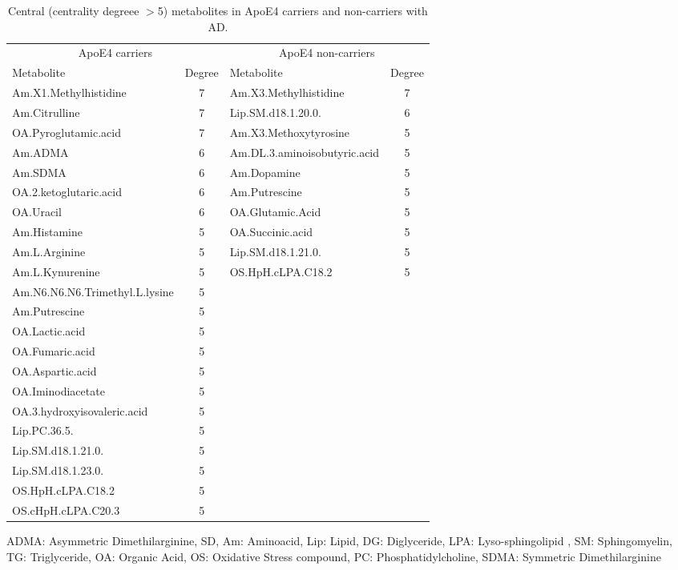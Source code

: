 \documentclass{amsart}
\begin{document}
\begin{table}[H]
  \caption{\label{tab:degrees} Central (centrality degreee $>$5) metabolites in ApoE4 carriers and non-carriers with AD.}
  \begin{threeparttable}
  \begin{tabular}{lclc}\toprule
  \multicolumn{2}{c}{ApoE4 carriers} & \multicolumn{2}{c}{ApoE4 non-carriers} \\
  Metabolite & Degree & Metabolite & Degree \\ \midrule
  Am.X1.Methylhistidine & 7 & Am.X3.Methylhistidine & 7 \\
  Am.Citrulline & 7 & Lip.SM.d18.1.20.0. & 6 \\
  OA.Pyroglutamic.acid & 7 & Am.X3.Methoxytyrosine & 5 \\
  Am.ADMA & 6 & Am.DL.3.aminoisobutyric.acid & 5 \\
  Am.SDMA & 6 & Am.Dopamine & 5 \\
  OA.2.ketoglutaric.acid & 6 & Am.Putrescine & 5 \\
  OA.Uracil & 6 & OA.Glutamic.Acid & 5 \\
  Am.Histamine & 5 & OA.Succinic.acid & 5 \\
  Am.L.Arginine & 5 & Lip.SM.d18.1.21.0. & 5 \\
  Am.L.Kynurenine & 5 & OS.HpH.cLPA.C18.2 & 5 \\
  Am.N6.N6.N6.Trimethyl.L.lysine & 5 &  &  \\
  Am.Putrescine & 5 &  &  \\
  OA.Lactic.acid & 5 &  &  \\
  OA.Fumaric.acid & 5 &  &  \\
  OA.Aspartic.acid & 5 &  &  \\
  OA.Iminodiacetate & 5 &  &  \\
  OA.3.hydroxyisovaleric.acid & 5 &  &  \\
  Lip.PC.36.5. & 5 &  &  \\
  Lip.SM.d18.1.21.0. & 5 &  &  \\
  Lip.SM.d18.1.23.0. & 5 &  &  \\
  OS.HpH.cLPA.C18.2 & 5 &  &  \\
  OS.cHpH.cLPA.C20.3 & 5 &  & \\ \bottomrule
  \end{tabular}
\begin{tablenotes}
\item[] ADMA: Asymmetric Dimethilarginine, SD, Am: Aminoacid, Lip: Lipid, DG: Diglyceride, LPA: Lyso-sphingolipid , SM: Sphingomyelin, TG: Triglyceride, OA: Organic Acid, OS: Oxidative Stress compound, PC: Phosphatidylcholine, SDMA: Symmetric Dimethilarginine
  
\end{tablenotes}
\end{threeparttable}
  \end{table}
\end{document}

